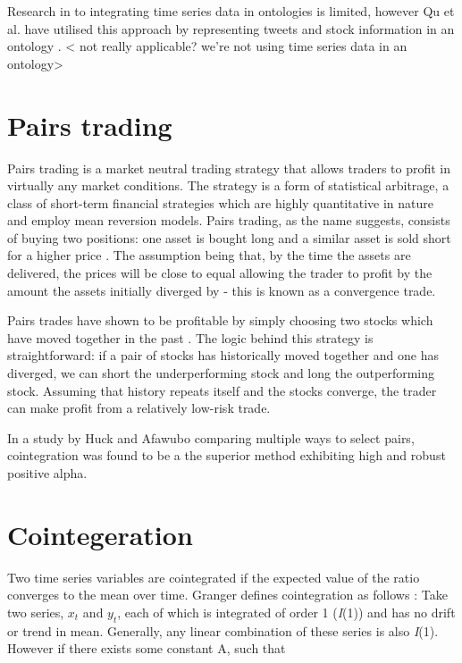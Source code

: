 \documentclass{UoYCSproject}
\begin{document}
Research in to integrating time series data in ontologies is limited, however Qu et al. have utilised this approach by representing tweets and stock information in an ontology \parencite{onttime}. < not really applicable? we're not using time series data in an ontology>

\section{Pairs trading}

Pairs trading is a market neutral trading strategy that allows traders to profit in virtually any market conditions. The strategy is a form of statistical arbitrage, a class of short-term financial strategies which are highly quantitative in nature and employ mean reversion models. Pairs trading, as the name suggests, consists of buying two positions: one asset is bought long and a similar asset is sold short for a higher price \parencite{pairsdesc}. The assumption being that, by the time the assets are delivered, the prices will be close to equal allowing the trader to profit by the amount the assets initially diverged by - this is known as a convergence trade.

Pairs trades have shown to be profitable by simply choosing two stocks which have moved together in the past \parencite{pairshistory}. The logic behind this strategy is straightforward: if a pair of stocks has historically moved together and one has diverged, we can short the underperforming stock and long the outperforming stock. Assuming that history repeats itself and the stocks converge, the trader can make profit from a relatively low-risk trade.

In a study by Huck and Afawubo \parencite{cointsupport} comparing multiple ways to select pairs, cointegration was found to be a the superior method exhibiting high and robust positive alpha.

\section{Cointegeration}

Two time series variables are cointegrated if the expected value of the ratio converges to the mean over time. Granger defines cointegration as follows \parencite{cointdef}:
Take two series, $x_{t}$ and $y_{t}$, each of which is integrated of order 1 (\emph{I}(1)) and has no drift or trend in mean. Generally, any linear combination of these series is also \emph{I}(1). However if there exists some constant A, such that
\end{document}
